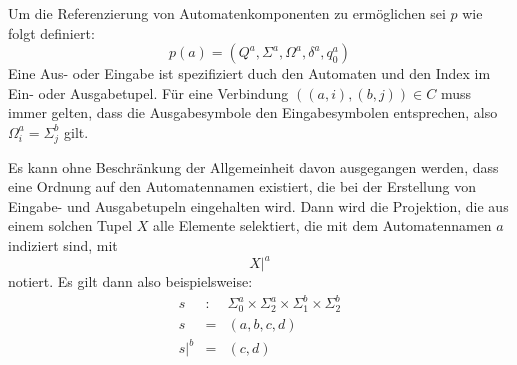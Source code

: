 Um die Referenzierung von Automatenkomponenten zu ermöglichen sei $p$ wie folgt definiert:
\[ p(a) = (Q^a,\Sigma^a,\Omega^a,\delta^a,q_0^a) \]
Eine Aus- oder Eingabe ist spezifiziert duch den Automaten und den Index im Ein- oder Ausgabetupel.
Für eine Verbindung $((a,i),(b,j))\in C$ muss immer gelten, dass die Ausgabesymbole den Eingabesymbolen entsprechen, also $\Omega_i^a = \Sigma_j^b$ gilt.

\begin{notation}
  Es kann ohne Beschränkung der Allgemeinheit davon ausgegangen werden, dass eine Ordnung auf den Automatennamen existiert, die bei der Erstellung von Eingabe- und Ausgabetupeln eingehalten wird.
  Dann wird die Projektion, die aus einem solchen Tupel $X$ alle Elemente selektiert, die mit dem Automatennamen $a$ indiziert sind, mit
  \[ X|^a \]
  notiert.
  Es gilt dann also beispielsweise:
  \begin{eqnarray*}
    s &:& \Sigma^a_0\times\Sigma^a_2\times\Sigma^b_1\times\Sigma^b_2\\
    s &=& (a,b,c,d)\\
    s|^b &=& (c,d)
  \end{eqnarray*}
\end{notation}

